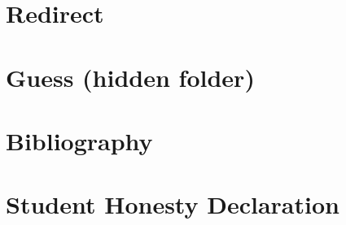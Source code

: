 \section{Redirect}




\section{Guess (hidden folder)}



\section{Bibliography}

\renewcommand{\refname}{\spacedlowsmallcaps{References}} %



%


%


\section{Student Honesty Declaration}





